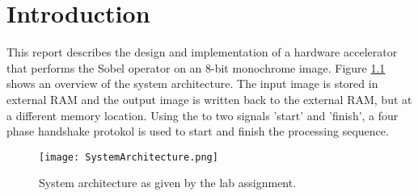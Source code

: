\chapter{Introduction}

This report describes the design and implementation of a hardware accelerator that performs the Sobel operator on an 8-bit monochrome image. Figure \ref{fig:SysArch} shows an overview of the system architecture. The input image is stored in external RAM and the output image is written back to the external RAM, but at a different memory location. Using the to two signals 'start' and 'finish', a four phase handshake protokol is used to start and finish the processing sequence.

\begin{figure}[H]
	\centering
	\texttt{[image: SystemArchitecture.png]}
	\caption{System architecture as given by the lab assignment.}
	\label{fig:SysArch}
\end{figure}

